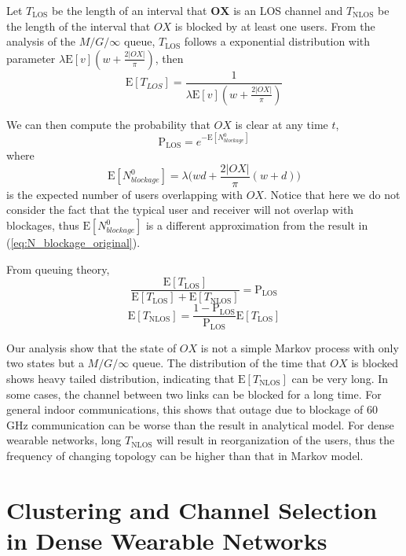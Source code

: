 \documentclass[10pt, conference, letterpaper]{IEEEtran}
\begin{document}
Let $T_{\mathrm{LOS}}$ be the length of an interval that $\mathbf{OX}$ is an LOS channel and $T_{\mathrm{NLOS}}$ be the length of the interval that $OX$ is blocked by at least one users. From the analysis of the $M/G/\infty$ queue, $T_{\mathrm{LOS}}$ follows a exponential distribution with parameter $\lambda\mathrm{E}[v](w + \frac{2|OX|}{\pi})$, then
\begin{equation}
\mathrm{E}[T_{LOS}]  = \frac{1}{\lambda\mathrm{E}[v](w + \frac{2|OX|}{\pi})}
\end{equation}


We can then compute the probability that $OX$ is clear at any time $t$, 
\begin{equation}
\mathrm{P}_{\mathrm{LOS}} = e^{-\mathrm{E}[N_{blockage}^0]}
\end{equation}
where 
\begin{equation*}
\mathrm{E}[N_{blockage}^0] = \lambda\big(wd+\frac{2|OX|}{\pi}(w+d)\big)
\end{equation*} 
is the expected number of users overlapping with $OX$. Notice that here we do not consider the fact that the typical user and receiver will not overlap with blockages, thus $\mathrm{E}[N_{blockage}^0]$ is a different approximation from the result in (\ref{eq:N_blockage_original}).

From queuing theory, 
\begin{equation}
\frac{\mathrm{E}[T_{\mathrm{LOS}}]}{\mathrm{E}[T_{\mathrm{LOS}}] + \mathrm{E}[T_{\mathrm{NLOS}}]} = \mathrm{P}_{\mathrm{LOS}}
\end{equation}
\begin{equation}
\mathrm{E}[T_{\mathrm{NLOS}}] = \frac{1-\mathrm{P}_{\mathrm{LOS}}}{ \mathrm{P}_{\mathrm{LOS}}}\mathrm{E}[T_{\mathrm{LOS}}]
\end{equation}

Our analysis show that the state of $OX$ is not a simple Markov process with only two states but a $M/G/\infty$ queue. The distribution of the time that $OX$ is blocked shows heavy tailed distribution, indicating that $\mathrm{E}[T_{\mathrm{NLOS}}]$ can be very long. In some cases, the channel between two links can be blocked for a long time. For general indoor communications, this shows that outage due to blockage of 60 GHz communication can be worse than the result in analytical model. For dense wearable networks, long $T_{\mathrm{NLOS}}$ will result in reorganization of the users, thus the frequency of changing topology can be higher than that in Markov model.

\section{Clustering and Channel Selection in Dense Wearable Networks}\label{section:MAC}
\end{document}
